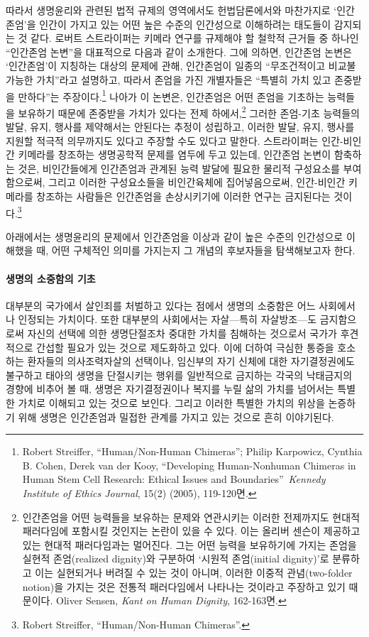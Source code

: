 따라서 생명윤리와 관련된 법적 규제의 영역에서도 헌법담론에서와 마찬가지로 `인간존엄'을 인간이 가지고 있는 어떤 높은 수준의 인간성으로 이해하려는 태도들이 감지되는 것 같다. 로버트 스트라이퍼는 키메라 연구를 규제해야 할 철학적 근거들 중 하나인 ``인간존엄 논변''을 대표적으로 다음과 같이 소개한다. 그에 의하면, 인간존엄 논변은 `인간존엄'이 지칭하는 대상의 문제에 관해, 인간존엄이 일종의 ``무조건적이고 비교불가능한 가치''라고 설명하고, 따라서 존엄을 가진 개별자들은 ``특별히 가치 있고 존중받을 만하다''는 주장이다.\footnote{Robert Streiffer, ``Human/Non-Human Chimeras''; Philip Karpowicz, Cynthia B. Cohen, Derek van der Kooy, ``Developing Human-Nonhuman Chimeras in Human Stem Cell Research: Ethical Issues and Boundaries''~\emph{Kennedy Institute of Ethics Journal}, 15(2) (2005), 119-120면.} 나아가 이 논변은, 인간존엄은 어떤 존엄을 기초하는 능력들을 보유하기 때문에 존중받을 가치가 있다는 전제 하에서,\footnote{인간존엄을 어떤 능력들을 보유하는 문제와 연관시키는 이러한 전제까지도 현대적 패러다임에 포함시킬 것인지는 논란이 있을 수 있다. 이는 올리버 센슨이 제공하고 있는 현대적 패러다임과는 멀어진다. 그는 어떤 능력을 보유하기에 가지는 존엄을 실현적 존엄(realized dignity)와 구분하여 `시원적 존엄(initial dignity)'로 분류하고 이는 실현되거나 버려질 수 있는 것이 아니며, 이러한 이중적 관념(two-folder notion)을 가지는 것은 전통적 패러다임에서 나타나는 것이라고 주장하고 있기 때문이다. Oliver Sensen, \emph{Kant on Human Dignity}, 162-163면.} 그러한 존엄-기초 능력들의 발달, 유지, 행사를 제약해서는 안된다는 추정이 성립하고, 이러한 발달, 유지, 행사를 지원할 적극적 의무까지도 있다고 주장할 수도 있다고 말한다. 스트라이퍼는 인간-비인간 키메라를 창조하는 생명공학적 문제를 염두에 두고 있는데, 인간존엄 논변이 함축하는 것은, 비인간들에게 인간존엄과 관계된 능력 발달에 필요한 물리적 구성요소를 부여함으로써, 그리고 이러한 구성요소들을 비인간육체에 집어넣음으로써, 인간-비인간 키메라를 창조하는 사람들은 인간존엄을 손상시키기에 이러한 연구는 금지된다는 것이다.\footnote{Robert Streiffer, ``Human/Non-Human Chimeras''.}

아래에서는 생명윤리의 문제에서 인간존엄을 이상과 같이 높은 수준의 인간성으로 이해했을 때, 어떤 구체적인 의미를 가지는지 그 개념의 후보자들을 탐색해보고자 한다.

\paragraph{생명의 소중함의 기초}

대부분의 국가에서 살인죄를 처벌하고 있다는 점에서 생명의 소중함은 어느 사회에서나 인정되는 가치이다. 또한 대부분의 사회에서는 자살---특히 자살방조---도 금지함으로써 자신의 선택에 의한 생명단절조차 중대한 가치를 침해하는 것으로서 국가가 후견적으로 간섭할 필요가 있는 것으로 제도화하고 있다. 이에 더하여 극심한 통증을 호소하는 환자들의 의사조력자살의 선택이나, 임신부의 자기 신체에 대한 자기결정권에도 불구하고 태아의 생명을 단절시키는 행위를 일반적으로 금지하는 각국의 낙태금지의 경향에 비추어 볼 때, 생명은 자기결정권이나 복지를 누릴 삶의 가치를 넘어서는 특별한 가치로 이해되고 있는 것으로 보인다. 그리고 이러한 특별한 가치의 위상을 논증하기 위해 생명은 인간존엄과 밀접한 관계를 가지고 있는 것으로 흔히 이야기된다.

